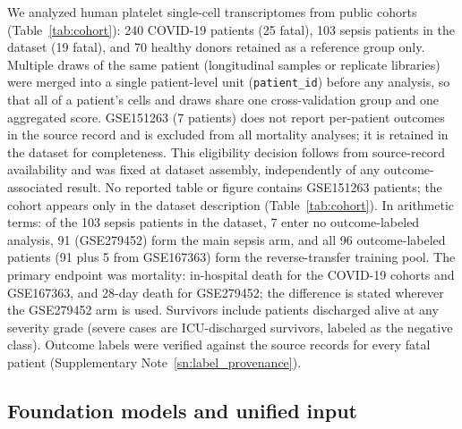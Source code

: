 \documentclass[11pt,a4paper]{article}
\begin{document}
We analyzed human platelet single-cell transcriptomes from public cohorts
(Table~\ref{tab:cohort}): 240 COVID-19 patients (25 fatal), 103 sepsis
patients in the dataset (19 fatal), and 70 healthy donors retained as a
reference group only. Multiple draws of the same patient (longitudinal samples
or replicate libraries) were merged into a single patient-level unit
(\texttt{patient\_id}) before any analysis, so that all of a patient's cells
and draws share one cross-validation group and one aggregated score.
GSE151263 (7 patients) does not report per-patient outcomes in the source
record and is excluded from all mortality analyses; it is retained in the
dataset for completeness. This eligibility decision follows from source-record
availability and was fixed at dataset assembly, independently of any
outcome-associated result. No reported table or figure contains GSE151263
patients; the cohort appears only in the dataset description
(Table~\ref{tab:cohort}). In arithmetic terms: of the 103 sepsis patients in
the dataset, 7 enter no outcome-labeled analysis, 91 (GSE279452) form the
main sepsis arm, and all 96 outcome-labeled patients (91 plus 5 from
GSE167363) form the reverse-transfer training pool.
The primary endpoint was mortality: in-hospital
death for the COVID-19 cohorts and GSE167363, and 28-day death for GSE279452;
the difference is stated wherever the GSE279452 arm is used. Survivors
include patients discharged alive at any severity grade (severe cases are
ICU-discharged survivors, labeled as the negative class). Outcome labels were
verified against the source records for every fatal patient
(Supplementary Note~\ref{sn:label_provenance}).

\subsection{Foundation models and unified input}
\label{ssec:methods_models}
\end{document}
